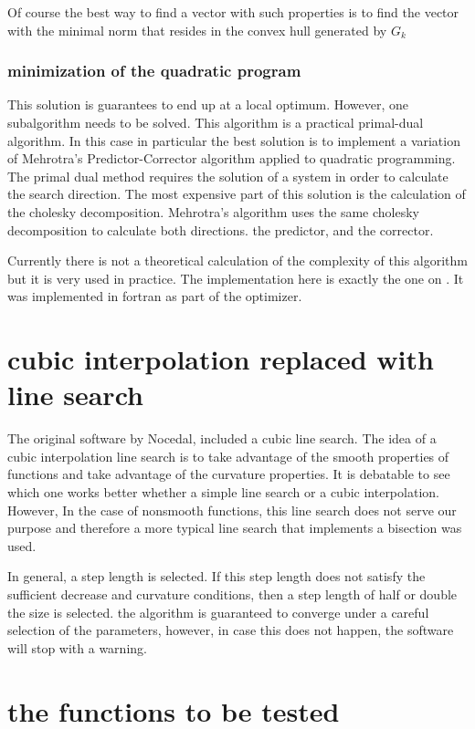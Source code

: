 Of course the best way to find a vector with such properties is to find the vector with the minimal norm that resides in the convex hull generated by $G_k$

\subsubsection{minimization of the quadratic program}

This solution is guarantees to end up at a local optimum. However, one subalgorithm needs to be solved. This algorithm is a practical primal-dual algorithm. In this case in particular the best solution is to implement a variation of Mehrotra's Predictor-Corrector algorithm applied to quadratic programming. The primal dual method requires the solution of a system in order to calculate the search direction. The most expensive part of this solution is the calculation of the cholesky decomposition. Mehrotra's algorithm uses the same cholesky decomposition to calculate both directions. the predictor, and the corrector.

Currently there is not a theoretical calculation of the complexity of this algorithm but it is very used in practice. The implementation here is exactly the one on \citep{Nocedal}. It was implemented in fortran as part of the optimizer.

\section{cubic interpolation replaced with line search}

The original software by Nocedal\citep{Nocedal}, included a cubic line search. The idea of a cubic interpolation line search is to take advantage of the smooth properties of functions and take advantage of the curvature properties. It is debatable to see which one works better whether a simple line search or a cubic interpolation. However, In the case of nonsmooth functions, this line search does not serve our purpose and therefore a more typical line search that implements a bisection was used.

In general, a step length is selected. If this step length does not satisfy the sufficient decrease and curvature conditions, then a step length of half or double the size is selected. the algorithm is guaranteed to converge under a careful selection of the parameters, however, in case this does not happen, the software will stop with a warning. 

\section{the functions to be tested}

